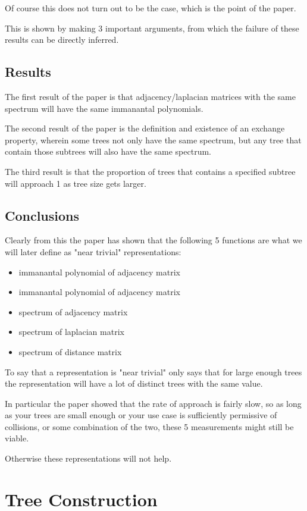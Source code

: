 \documentclass{report}
\begin{document}
Of course this does not turn out to be the case, which is the point of the paper.

This is shown by making 3 important arguments, from which the failure of these results can be directly inferred.

\subsection{Results}

The first result of the paper is that adjacency/laplacian matrices with the same spectrum will have the same immanantal polynomials.

The second result of the paper is the definition and existence of an exchange property, wherein some trees not only have the same spectrum, but any tree that contain those subtrees will also have the same spectrum.

The third result is that the proportion of trees that contains a specified subtree will approach 1 as tree size gets larger.

\subsection{Conclusions}

Clearly from this the paper has shown that the following 5 functions are what we will later define as "near trivial" representations:
\begin{itemize}
	\item immanantal polynomial of adjacency matrix
	\item immanantal polynomial of adjacency matrix
	\item spectrum of adjacency matrix
	\item spectrum of laplacian matrix
	\item spectrum of distance matrix
\end{itemize}

To say that a representation is "near trivial" only says that for large enough trees the representation will have a lot of distinct trees with the same value.

In particular the paper showed that the rate of approach is fairly slow, so as long as your trees are small enough or your use case is sufficiently permissive of collisions, or some combination of the two, these 5 measurements might still be viable.

Otherwise these representations will not help.

\section{Tree Construction}
\end{document}
